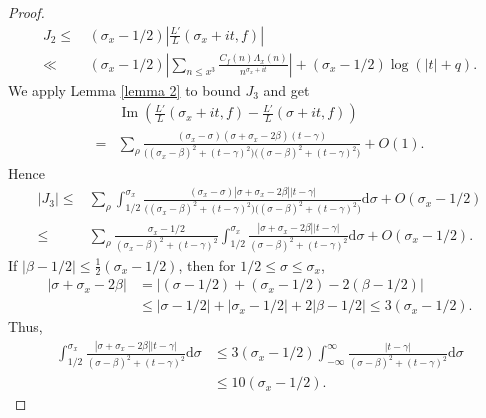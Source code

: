 \documentclass[11pt,reqno]{amsart}
\numberwithin{equation}{section}
\theoremstyle{plain}
\theoremstyle{definition}
\renewcommand{\Im}{\operatorname{Im}}
\begin{document}
\begin{proof}
\begin{equation*}
\begin{split}
J_2\leq&\,(\sigma_x-1/2)\left|\frac{L'}{L}(\sigma_x+it,f)\right|\\
\ll&\,(\sigma_x-1/2)\left|\sum_{n\leq x^3} \frac{C_f(n)\Lambda_x(n)}{n^{\sigma_x+it}}\right|
+(\sigma_x-1/2)\log(|t|+q).
\end{split}
\end{equation*}
We apply Lemma \ref{lemma 2} to bound $J_3$ and get
\begin{equation*}
\begin{split}
&\Im\left( \frac{L'}{L}(\sigma_x+it,f)-\frac{L'}{L}(\sigma+it,f)\right)\\
=&\sum_\rho \frac{(\sigma_x-\sigma)(\sigma+\sigma_x-2\beta)(t-\gamma)}
{\big((\sigma_x-\beta)^2+(t-\gamma)^2\big)\big((\sigma-\beta)^2+(t-\gamma)^2\big)}
+O(1).
\end{split}
\end{equation*}
Hence
\begin{equation*}
\begin{split}
|J_3|\leq&\sum_\rho\int_{1/2}^{\sigma_x}
 \frac{(\sigma_x-\sigma)|\sigma+\sigma_x-2\beta||t-\gamma|}
{\big((\sigma_x-\beta)^2+(t-\gamma)^2\big)\big((\sigma-\beta)^2+(t-\gamma)^2\big)}\mathrm{d}\sigma
+O(\sigma_x-1/2)\\
\leq&\sum_\rho\frac{\sigma_x-1/2}{(\sigma_x-\beta)^2+(t-\gamma)^2}\int_{1/2}^{\sigma_x}
 \frac{|\sigma+\sigma_x-2\beta||t-\gamma|}
{(\sigma-\beta)^2+(t-\gamma)^2}\mathrm{d}\sigma
+O(\sigma_x-1/2).
\end{split}
\end{equation*}
If $|\beta-1/2|\leq\frac{1}{2}(\sigma_x-1/2)$, then for $1/2\leq\sigma\leq\sigma_x$,
\begin{equation*}
\begin{split}
|\sigma+\sigma_x-2\beta|&=|(\sigma-1/2)+(\sigma_x-1/2)-2(\beta-1/2)|\\
&\leq |\sigma-1/2|+|\sigma_x-1/2|+2|\beta-1/2|\leq 3(\sigma_x-1/2).
\end{split}
\end{equation*}
Thus,
\begin{equation*}
\begin{split}
\int_{1/2}^{\sigma_x}
 \frac{|\sigma+\sigma_x-2\beta||t-\gamma|}
{(\sigma-\beta)^2+(t-\gamma)^2}\mathrm{d}\sigma
&\leq 3(\sigma_x-1/2)\int_{-\infty}^\infty\frac{|t-\gamma|}
{(\sigma-\beta)^2+(t-\gamma)^2}\mathrm{d}\sigma\\
&\leq 10(\sigma_x-1/2).
\end{split}
\end{equation*}

\end{proof}
\end{document}
